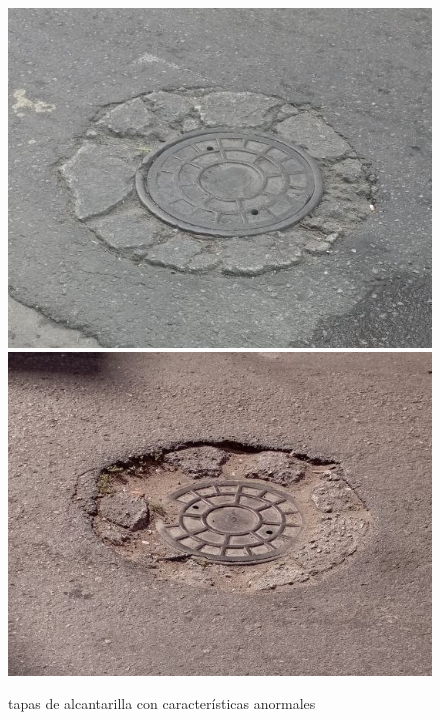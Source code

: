\begin{appendices}
		\begin{figure}[htb]
			\centering
			\includegraphics[scale = 0.3]{Graphics/pothole_4.jpg}
			\includegraphics[scale = 0.3]{Graphics/pothole_5.jpg}
			\caption{tapas de alcantarilla con características anormales}
			\label{fig:15}
		\end{figure}
		\newpage


\end{appendices}
